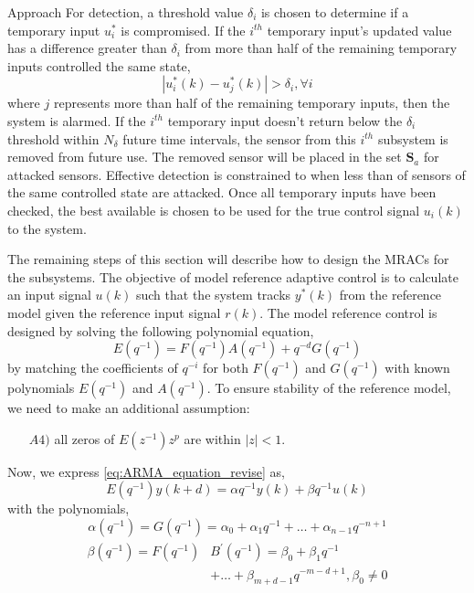 \begin{section}{Approach}
For detection, a threshold value $\delta_i$ is chosen to determine if a temporary input $u_i^*$ is compromised. If the $i^{th}$ temporary input's updated value has a difference greater than $\delta_i$ from more than half of the remaining temporary inputs controlled the same state,
\begin{equation}
    |u^*_i(k)-u^*_j(k)|>\delta_i, \forall i
\end{equation}
where $j$ represents more than half of the remaining temporary inputs, then the system is alarmed. If the $i^{th}$ temporary input doesn't return below the $\delta_i$ threshold within $N_{\delta}$ future time intervals, the sensor from this $i^{th}$ subsystem is removed from future use. The removed sensor will be placed in the set $\mathcal{\bm{S}}_a$ for attacked sensors. Effective detection is constrained to when less than of sensors of the same controlled state are attacked. Once all temporary inputs have been checked, the best available is chosen to be used for the true control signal $u_i(k)$ to the system.







The remaining steps of this section will describe how to design the MRACs for the subsystems. The objective of model reference adaptive control is to calculate an input signal $u(k)$ such that the system tracks $y^{*}(k)$ from the reference model given the reference input signal $r(k)$. The model reference control is designed by solving the following polynomial equation,
    \begin{equation}
	E(q^{-1})=F(q^{-1})A(q^{-1})+q^{-d}G(q^{-1})
	\end{equation}
by matching the coefficients of $q^{-i}$ for both $F(q^{-1})$ and $G(q^{-1})$ with  known polynomials $E(q^{-1})$ and $A(q^{-1})$.
To ensure stability of the reference model, we need to make an additional assumption:
    \begin{enumerate}[leftmargin=4\parindent]
	\item[$A4)$] all zeros of $E(z^{-1})z^p$ are within $|z|<1$. 
	\end{enumerate}	
Now, we express \eqref{eq:ARMA_equation_revise} as,
	\begin{equation}
	\label{eq:ARMA_equation_revise2}
	E(q^{-1})y(k+d)={\alpha}q^{-1}y(k) + {\beta}q^{-1}u(k)
	\end{equation}
with the polynomials,
	\begin{equation}
	\alpha(q^{-1})=G(q^{-1})=\alpha_0+\alpha_1q^{-1}+ \dots +\alpha_{n-1}q^{-n+1}
	\end{equation}
	\begin{align}
	\begin{split}
	\beta( q^{-1})= F(q^{-1})&B^{'}(q^{-1})=\beta_0+\beta_1q^{-1} \\
	& + \dots +\beta_{m+d-1}q^{-m-d+1}, \beta_0\neq0
	\end{split}
	\end{align}


\end{section}
